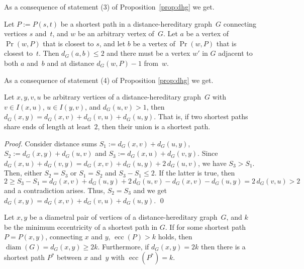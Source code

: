 \documentclass[10pt]{llncs}
\DeclareMathOperator{\ecc}{ecc}
\DeclareMathOperator{\diam}{diam}
\begin{document}
As a consequence of statement (3) of Proposition~\ref{prop:dhg} we get. 

\begin{corollary}
    \label{cor:pr-size} 
Let $P := P(s,t)$ be a shortest path in a distance-hereditary graph~$G$ connecting vertices $s$ and~$t$, and $w$ be an arbitrary vertex of~$G$. 
Let $a$ be a vertex of $\Pr(w, P)$ that is closest to $s$, and let $b$ be a vertex of $\Pr(w,P)$ that is closest to~$t$. 
Then $d_G(a,b) \leq 2$ and there must be a vertex $w'$ in $G$ adjacent to both $a$ and~$b$ and at distance $d_G(w,P) - 1$ from~$w$. 
\end{corollary}

As a consequence of statement (4) of Proposition \ref{prop:dhg} we get. 

\begin{corollary}
    \label{cor:two-paths} 
Let $x,y,v,u$ be arbitrary vertices of a distance-hereditary graph~$G$ with $v \in I(x,u)$, $u \in I(y,v)$, and $d_G(u,v) > 1$, then $d_G(x,y) = d_G(x,v) + d_G(v,u) + d_G(u,y)$. 
That is, if two shortest paths share ends of length at least~$2$, then their union is a shortest path. 
\end{corollary} 

\begin{proof}
Consider distance sums $S_1 := d_G(x,v) + d_G(u,y)$, $S_2 := d_G(x,y) + d_G(u,v)$ and $S_3 := d_G(x,u)+d_G(v,y)$. 
Since $d_G(x,u) + d_G(v,y) = d_G(x,v) + d_G(u,y) + 2 \, d_G(u,v)$, we have $S_3 > S_1$. 
Then, either $S_2 = S_3$ or $S_1 = S_2$ and $S_3 - S_1 \leq 2$. 
If the latter is true, then $2 \geq S_3 - S_1 = d_G(x,v) + d_G(u,y) + 2 \, d_G(u,v) - d_G(x,v) - d_G(u,y) = 2 \, d_G(v,u) > 2$ and a contradiction arises.
Thus, $S_2 = S_3$ and we get $d_G(x,y) = d_G(x,v) + d_G(v,u) + d_G(u,y)$.
\qed
\end{proof}


\begin{lemma}
    \label{lm:dhg} 
Let $x,y$ be a diametral pair of vertices of a distance-hereditary graph~$G$, and $k$ be the minimum eccentricity of a shortest path in $G$. 
If for some shortest path $P = P(x,y)$, connecting $x$ and $y$, $\ecc(P) > k$ holds, then $\diam(G) = d_G(x,y) \geq 2k$. 
Furthermore, if $d_G(x,y) = 2k$ then there is a shortest path $P^*$ between $x$ and~$y$ with $\ecc(P^*) = k$. 
\end{lemma} 
\end{document}
